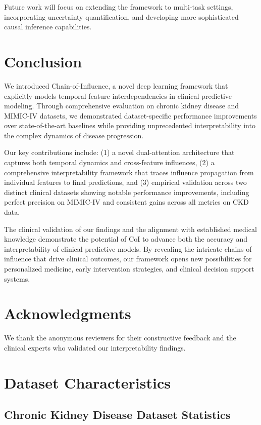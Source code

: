 \documentclass[letterpaper]{article}
\begin{document}
\begin{enumerate}
Future work will focus on extending the framework to multi-task settings, incorporating uncertainty quantification, and developing more sophisticated causal inference capabilities.

\section{Conclusion}

We introduced Chain-of-Influence, a novel deep learning framework that explicitly models temporal-feature interdependencies in clinical predictive modeling. Through comprehensive evaluation on chronic kidney disease and MIMIC-IV datasets, we demonstrated dataset-specific performance improvements over state-of-the-art baselines while providing unprecedented interpretability into the complex dynamics of disease progression.

Our key contributions include: (1) a novel dual-attention architecture that captures both temporal dynamics and cross-feature influences, (2) a comprehensive interpretability framework that traces influence propagation from individual features to final predictions, and (3) empirical validation across two distinct clinical datasets showing notable performance improvements, including perfect precision on MIMIC-IV and consistent gains across all metrics on CKD data.

The clinical validation of our findings and the alignment with established medical knowledge demonstrate the potential of CoI to advance both the accuracy and interpretability of clinical predictive models. By revealing the intricate chains of influence that drive clinical outcomes, our framework opens new possibilities for personalized medicine, early intervention strategies, and clinical decision support systems.

\section*{Acknowledgments}

We thank the anonymous reviewers for their constructive feedback and the clinical experts who validated our interpretability findings.

\appendix

\section{Dataset Characteristics}

\subsection{Chronic Kidney Disease Dataset Statistics}


\end{enumerate}
\end{document}
